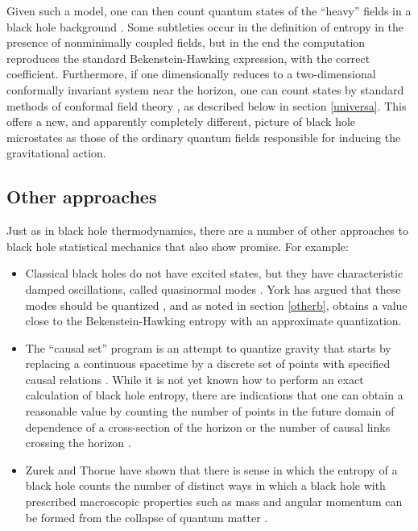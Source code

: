 \documentclass[11pt]{article}
\begin{document}
Given such a model, one can then count quantum states of the 
``heavy'' fields in a black hole background \cite{Frolovx,Frolovb}.
Some subtleties occur in the definition of entropy in the
presence of nonminimally coupled fields, but in the end the 
computation reproduces the standard Bekenstein-Hawking 
expression, with the correct coefficient.  Furthermore, 
if one dimensionally reduces to a two-dimensional conformally 
invariant system near the horizon,  
one can count states by standard methods of conformal field
theory \cite{Frolovc}, as described below in section \ref{universa}.  
This offers a new, and apparently completely different, picture 
of black hole microstates as those of the ordinary quantum fields 
responsible for inducing the gravitational action.

\subsection{Other approaches}

Just as in black hole thermodynamics, there are a number of
other approaches to black hole statistical mechanics that also
show promise.  For example:

\begin{itemize}
\item Classical black holes do not have excited states, but they
have characteristic damped oscillations, called quasinormal 
modes \cite{Siopsis}.  York has argued that these modes should be 
quantized \cite{York}, and as noted in section \ref{otherb}, obtains a 
value close to the Bekenstein-Hawking entropy with an approximate
quantization.

\item The ``causal set'' program is an attempt to quantize gravity
that starts by replacing a continuous spacetime by a discrete set
of points with specified causal relations \cite{Sorkin_caus}.  While
it is not yet known how to perform an exact calculation of black
hole entropy, there
are indications that one can obtain a reasonable value by counting
the number of points in the future domain of dependence of a
cross-section of the horizon \cite{Rideout} or the number of
causal links crossing the horizon \cite{Dou}.

\item Zurek and Thorne have shown that there is sense in which 
the entropy of a black hole counts the number of distinct ways
in which a black hole with prescribed macroscopic properties
such as mass and angular momentum can be formed from the
collapse of quantum matter \cite{Zurek}.
\end{itemize}
\end{document}
